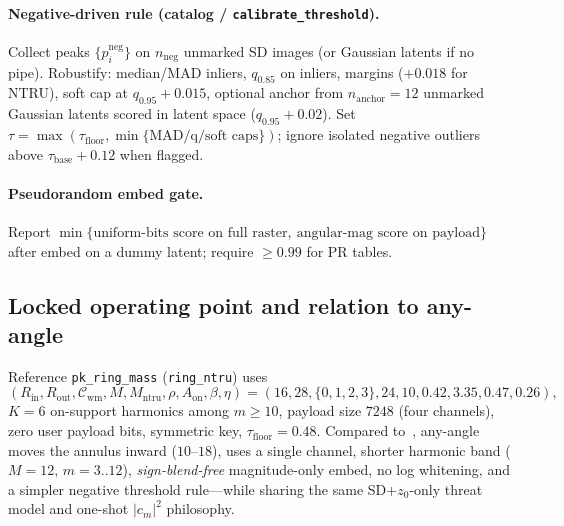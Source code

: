 \paragraph{Negative-driven rule (catalog / \texttt{calibrate\_threshold}).}
Collect peaks $\{p_i^{\mathrm{neg}}\}$ on $n_{\mathrm{neg}}$ unmarked SD images (or
Gaussian latents if no pipe).
Robustify: median/MAD inliers, $q_{0.85}$ on inliers, margins
($+0.018$ for NTRU), soft cap at $q_{0.95}+0.015$, optional anchor from
$n_{\mathrm{anchor}}=12$ unmarked Gaussian latents scored in latent space
($q_{0.95}+0.02$).
Set $\tau=\max(\tau_{\mathrm{floor}},\min\{\text{MAD/q/soft caps}\})$; ignore isolated
negative outliers above $\tau_{\mathrm{base}}+0.12$ when flagged.

\paragraph{Pseudorandom embed gate.}
Report $\min\{\text{uniform-bits score on full raster},\ \text{angular-mag score on payload}\}$ after embed on a dummy latent; require $\ge 0.99$ for PR tables.

\subsection{Locked operating point and relation to any-angle}
\label{sec:b3-params}

Reference \texttt{pk\_ring\_mass} (\texttt{ring\_ntru}) uses
\[
(R_{\mathrm{in}},R_{\mathrm{out}},\mathcal{C}_{\mathrm{wm}},M,M_{\mathrm{ntru}},\rho,
A_{\mathrm{on}},\beta,\eta)
=(16,28,\{0,1,2,3\},24,10,0.42,3.35,0.47,0.26),
\]
$K=6$ on-support harmonics among $m\ge 10$, payload size $7248$ (four channels),
zero user payload bits, symmetric key, $\tau_{\mathrm{floor}}=0.48$.
Compared to~, any-angle moves the annulus inward
($10$--$18$), uses a single channel, shorter harmonic band ($M=12$, $m=3..12$),
\emph{sign-blend-free} magnitude-only embed, no log whitening, and a simpler
negative threshold rule---while sharing the same SD+$z_0$-only threat model and
one-shot $|c_m|^2$ philosophy.
